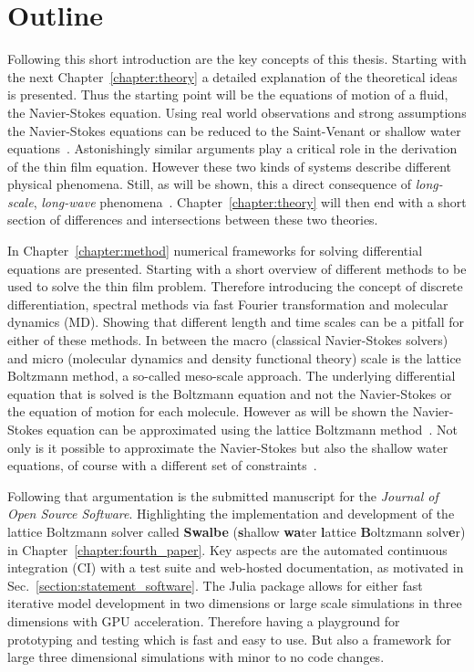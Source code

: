 \section{Outline}
\label{section:outline}
Following this short introduction are the key concepts of this thesis.
Starting with the next Chapter~\ref{chapter:theory} a detailed explanation of the theoretical ideas is presented.
Thus the starting point will be the equations of motion of a fluid, the Navier-Stokes equation.
Using real world observations and strong assumptions the Navier-Stokes equations can be reduced to the Saint-Venant or shallow water equations~\cite{saint1871theorie, williamson1992standard}.
Astonishingly similar arguments play a critical role in the derivation of the thin film equation.
However these two kinds of systems describe different physical phenomena.
Still, as will be shown, this a direct consequence of \textit{long-scale}, \textit{long-wave}  phenomena~\cite{oronLongscaleEvolutionThin1997}.
Chapter~\ref{chapter:theory} will then end with a short section of differences and intersections between these two theories.

In Chapter~\ref{chapter:method} numerical frameworks for solving differential equations are presented.
Starting with a short overview of different methods to be used to solve the thin film problem.
Therefore introducing the concept of discrete differentiation, spectral methods via fast Fourier transformation and molecular dynamics (MD).
Showing that different length and time scales can be a pitfall for either of these methods.
In between the macro (classical Navier-Stokes solvers) and micro (molecular dynamics and density functional theory) scale is the lattice Boltzmann method, a so-called meso-scale approach.
The underlying differential equation that is solved is the Boltzmann equation and not the Navier-Stokes or the equation of motion for each molecule.
However as will be shown the Navier-Stokes equation can be approximated using the lattice Boltzmann method~\cite{Enskog, Chapman, chenLatticeBoltzmannMethod1998, krugerLatticeBoltzmannMethod2017}.  
Not only is it possible to approximate the Navier-Stokes but also the shallow water equations, of course with a different set of constraints~\cite{Salmon:1999:0022-2402:503, zhou2004lattice, van2010study, PhysRevE.65.036309}.

Following that argumentation is the submitted manuscript for the \textit{Journal of Open Source Software}. 
Highlighting the implementation and development of the lattice Boltzmann solver called \textbf{Swalbe} (\textbf{s}hallow \textbf{wa}ter \textbf{l}attice \textbf{B}oltzmann solv\textbf{e}r) in Chapter~\ref{chapter:fourth_paper}.
Key aspects are the automated continuous integration (CI) with a test suite and web-hosted documentation, as motivated in Sec.~\ref{section:statement_software}.
The Julia package allows for either fast iterative model development in two dimensions or large scale simulations in three dimensions with GPU acceleration.
Therefore having a playground for prototyping and testing which is fast and easy to use.
But also a framework for large three dimensional simulations with minor to no code changes.

